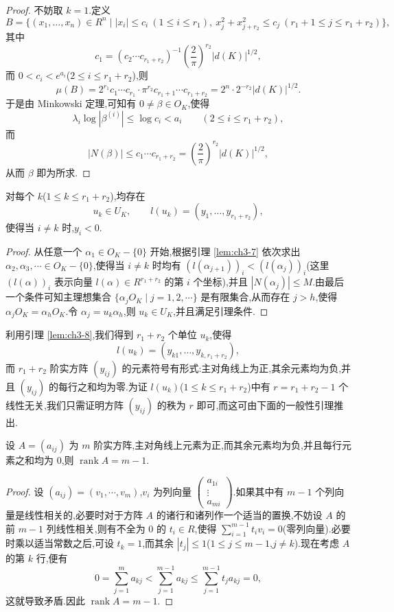 \begin{proof}
不妨取 $k=1$.定义
\[
  B=\{(x_1,\dots,x_n)\in R^n\mid |x_i|\leqslant c_i\ (1\leqslant i\leqslant r_1),\ x_j^2+x_{j+r_2}^2\leqslant c_j\ (r_1+1\leqslant j\leqslant r_1+r_2)\},
\]
其中
\[
  c_1=(c_2\cdots c_{r_1+r_2})^{-1}\left(\frac{2}{\pi}\right)^{r_2}|d(K)|^{1/2},
\]
而 $0<c_i<e^{a_i}$($2\leqslant i\leqslant r_1+r_2$),则
\[
  \mu(B)=2^{r_1}c_1\cdots c_{r_1}\cdot\pi^{r_2}c_{r_1+1}\cdots c_{r_1+r_2}
  =2^n\cdot 2^{-r_2}|d(K)|^{1/2}.
\]
于是由 Minkowski 定理,可知有 $0\neq\beta\in O_K$,使得
\[
  \lambda_i\log|\beta^{(i)}|\leqslant\log c_i<a_i\qquad(2\leqslant i\leqslant r_1+r_2),
\]
而
\[
  |N(\beta)|\leqslant c_1\cdots c_{r_1+r_2}=\left(\frac{2}{\pi}\right)^{r_2}|d(K)|^{1/2},
\]
从而 $\beta$ 即为所求.
\end{proof}

\begin{lemma}\label{lem:ch3-8}
对每个 $k$($1\leqslant k\leqslant r_1+r_2$),均存在
\[
  u_k\in U_K,\qquad l(u_k)=(y_1,\dots,y_{r_1+r_2}),
\]
使得当 $i\neq k$ 时,$y_i<0$.
\end{lemma}

\begin{proof}
从任意一个 $\alpha_1\in O_K-\{0\}$ 开始,根据引理 \ref{lem:ch3-7} 依次求出 $\alpha_2,\alpha_3,\cdots\in O_K-\{0\}$,使得当 $i\neq k$ 时均有 $(l(\alpha_{j+1}))_i<(l(\alpha_j))_i$(这里 $(l(\alpha))_i$ 表示向量 $l(\alpha)\in R^{r_1+r_2}$ 的第 $i$ 个坐标),并且 $|N(\alpha_j)|\leqslant M$.由最后一个条件可知主理想集合 $\{\alpha_jO_K\mid j=1,2,\cdots\}$ 是有限集合,从而存在 $j>h$,使得 $\alpha_jO_K=\alpha_hO_K$.令 $\alpha_j=u_k\alpha_h$,则 $u_k\in U_K$,并且满足引理条件.
\end{proof}

利用引理 \ref{lem:ch3-8},我们得到 $r_1+r_2$ 个单位 $u_k$,使得
\[
  l(u_k)=(y_{k1},\dots,y_{k,r_1+r_2}),
\]
而 $r_1+r_2$ 阶实方阵 $(y_{ij})$ 的元素符号有形式:主对角线上为正,其余元素均为负,并且 $(y_{ij})$ 的每行之和均为零.为证 $l(u_k)$($1\leqslant k\leqslant r_1+r_2$)中有 $r=r_1+r_2-1$ 个线性无关,我们只需证明方阵 $(y_{ij})$ 的秩为 $r$ 即可,而这可由下面的一般性引理推出.

\begin{lemma}\label{lem:ch3-9}
设 $A=(a_{ij})$ 为 $m$ 阶实方阵,主对角线上元素为正,而其余元素均为负,并且每行元素之和均为 $0$,则 $\operatorname{rank}A=m-1$.
\end{lemma}

\begin{proof}
设 $(a_{ij})=(v_1,\cdots,v_m)$,$v_i$ 为列向量 $\begin{pmatrix}a_{1i}\\ \vdots\\ a_{mi}\end{pmatrix}$.如果其中有 $m-1$ 个列向量是线性相关的,必要时对于方阵 $A$ 的诸行和诸列作一个适当的置换,不妨设 $A$ 的前 $m-1$ 列线性相关,则有不全为 $0$ 的 $t_i\in R$,使得 $\sum_{i=1}^{m-1}t_iv_i=0$(零列向量).必要时乘以适当常数之后,可设 $t_k=1$,而其余 $|t_j|\leqslant 1$($1\leqslant j\leqslant m-1$,$j\neq k$).现在考虑 $A$ 的第 $k$ 行,便有
\[
  0=\sum_{j=1}^{m}a_{kj}<\sum_{j=1}^{m-1}a_{kj}\leqslant\sum_{j=1}^{m-1}t_ja_{kj}=0,
\]
这就导致矛盾.因此 $\operatorname{rank}A=m-1$.
\end{proof}

